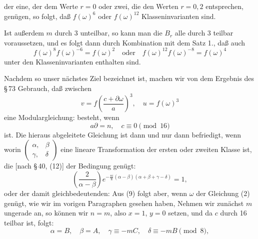 

der eine, der dem Werte $r=0$ oder zwei, die den Werten $r=0,2$ entsprechen, genügen, so folgt, daß $f(\omega)^6$ oder $f(\omega)^{12}$ Klasseninvarianten sind.

Ist außerdem $m$ durch 3 unteilbar, so kann man die $B_r$ alle durch 3 teilbar voraussetzen, und es folgt dann durch Kombination mit dem Satz 1., daß auch
\[
f(\omega)^8f(\omega)^{-6}=f(\omega)^2 \quad\text{oder}\quad f(\omega)^{12}f(\omega)^{-8}=f(\omega)^4
\]
unter den Klasseninvarianten enthalten sind.

Nachdem so unser nächstes Ziel bezeichnet ist, machen wir von dem Ergebnis des \S\,73 Gebrauch, daß zwischen
\[
v=f\!\left(\frac{c+\partial\omega}{a}\right)^{3},\quad u=f(\omega)^3
\]
eine Modulargleichung:
besteht, wenn
\[
a\partial=n,\quad c\equiv 0\pmod{16}
\]
ist. Die hieraus abgeleitete Gleichung
ist dann und nur dann befriedigt, wenn
worin $\begin{pmatrix}\alpha, & \beta\\ \gamma, & \delta\end{pmatrix}$ eine lineare Transformation der ersten oder zweiten Klasse ist, die [nach \S\,40, (12)] der Bedingung genügt:
\[
\left(\frac{2}{\alpha-\beta}\right)e^{-\frac{\pi i}{8}(\alpha-\beta)(\alpha+\beta+\gamma-\delta)}=1,
\]
oder der damit gleichbedeutenden:
Aus (9) folgt aber, wenn $\omega$ der Gleichung (2) genügt, wie wir im vorigen Paragraphen gesehen haben,
Nehmen wir zunächst $m$ ungerade an, so können wir $n=m$, also $x=1$, $y=0$ setzen, und da $c$ durch 16 teilbar ist, folgt:
\[
\alpha=B,\quad \beta=A,\quad \gamma\equiv -mC,\quad \delta\equiv -mB\pmod{8},
\]
